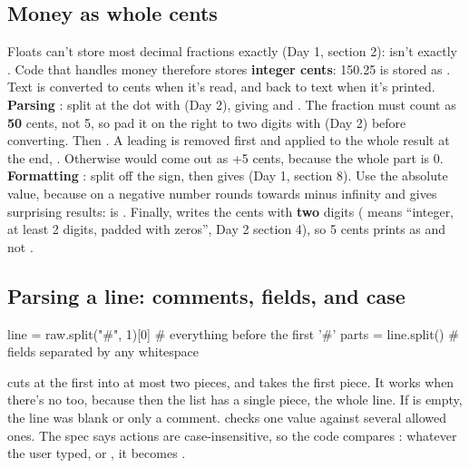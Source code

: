 \documentclass[10pt,a4paper]{article}
\begin{document}
\subsection{Money as whole cents}
Floats can’t store most decimal fractions exactly (Day 1, section 2):  isn’t exactly . Code that handles money therefore stores \textbf{integer cents}: 150.25 is stored as . Text is converted to cents when it’s read, and back to text when it’s printed.
\textbf{Parsing} \code{\textquotedbl{}150.5\textquotedbl{}}: split at the dot with  (Day 2), giving \code{\textquotedbl{}150\textquotedbl{}} and \code{\textquotedbl{}5\textquotedbl{}}. The fraction must count as \textbf{50} cents, not 5, so pad it on the right to two digits with  (Day 2) before converting. Then . A leading \code{-} is removed first and applied to the whole result at the end, . Otherwise \code{\textquotedbl{}-0.05\textquotedbl{}} would come out as +5 cents, because the whole part  is 0.
\textbf{Formatting} : split off the sign, then  gives  (Day 1, section 8). Use the absolute value, because  on a negative number rounds towards minus infinity and gives surprising results:  is . Finally,  writes the cents with \textbf{two} digits ( means “integer, at least 2 digits, padded with zeros”, Day 2 section 4), so 5 cents prints as  and not .
\subsection{Parsing a line: comments, fields, and case}
\begin{pycode}
line = raw.split("#", 1)[0]     # everything before the first '#'
parts = line.split()            # fields separated by any whitespace
\end{pycode}
 cuts at the first \code{\#} into at most two pieces, and \code{[0]} takes the first piece. It works when there’s no \code{\#} too, because then the list has a single piece, the whole line. If  is empty, the line was blank or only a comment.
 checks one value against several allowed ones. The spec says actions are case-insensitive, so the code compares : whatever the user typed,  or , it becomes .
\end{document}
